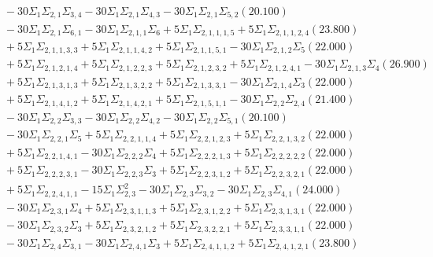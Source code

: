 \documentclass[12pt]{article}
\begin{document}
\begin{landscape}
\begin{align*}
		&\quad\quad -30\Sigma_{1}\Sigma_{2,1}\Sigma_{3,4}-30\Sigma_{1}\Sigma_{2,1}\Sigma_{4,3}-30\Sigma_{1}\Sigma_{2,1}\Sigma_{5,2}(20.100) \\ 
		&\quad\quad -30\Sigma_{1}\Sigma_{2,1}\Sigma_{6,1}-30\Sigma_{1}\Sigma_{2,1,1}\Sigma_{6}+5\Sigma_{1}\Sigma_{2,1,1,1,5}+5\Sigma_{1}\Sigma_{2,1,1,2,4}(23.800) \\ 
		&\quad\quad +5\Sigma_{1}\Sigma_{2,1,1,3,3}+5\Sigma_{1}\Sigma_{2,1,1,4,2}+5\Sigma_{1}\Sigma_{2,1,1,5,1}-30\Sigma_{1}\Sigma_{2,1,2}\Sigma_{5}(22.000) \\ 
		&\quad\quad +5\Sigma_{1}\Sigma_{2,1,2,1,4}+5\Sigma_{1}\Sigma_{2,1,2,2,3}+5\Sigma_{1}\Sigma_{2,1,2,3,2}+5\Sigma_{1}\Sigma_{2,1,2,4,1}-30\Sigma_{1}\Sigma_{2,1,3}\Sigma_{4}(26.900) \\ 
		&\quad\quad +5\Sigma_{1}\Sigma_{2,1,3,1,3}+5\Sigma_{1}\Sigma_{2,1,3,2,2}+5\Sigma_{1}\Sigma_{2,1,3,3,1}-30\Sigma_{1}\Sigma_{2,1,4}\Sigma_{3}(22.000) \\ 
		&\quad\quad +5\Sigma_{1}\Sigma_{2,1,4,1,2}+5\Sigma_{1}\Sigma_{2,1,4,2,1}+5\Sigma_{1}\Sigma_{2,1,5,1,1}-30\Sigma_{1}\Sigma_{2,2}\Sigma_{2,4}(21.400) \\ 
		&\quad\quad -30\Sigma_{1}\Sigma_{2,2}\Sigma_{3,3}-30\Sigma_{1}\Sigma_{2,2}\Sigma_{4,2}-30\Sigma_{1}\Sigma_{2,2}\Sigma_{5,1}(20.100) \\ 
		&\quad\quad -30\Sigma_{1}\Sigma_{2,2,1}\Sigma_{5}+5\Sigma_{1}\Sigma_{2,2,1,1,4}+5\Sigma_{1}\Sigma_{2,2,1,2,3}+5\Sigma_{1}\Sigma_{2,2,1,3,2}(22.000) \\ 
		&\quad\quad +5\Sigma_{1}\Sigma_{2,2,1,4,1}-30\Sigma_{1}\Sigma_{2,2,2}\Sigma_{4}+5\Sigma_{1}\Sigma_{2,2,2,1,3}+5\Sigma_{1}\Sigma_{2,2,2,2,2}(22.000) \\ 
		&\quad\quad +5\Sigma_{1}\Sigma_{2,2,2,3,1}-30\Sigma_{1}\Sigma_{2,2,3}\Sigma_{3}+5\Sigma_{1}\Sigma_{2,2,3,1,2}+5\Sigma_{1}\Sigma_{2,2,3,2,1}(22.000) \\ 
		&\quad\quad +5\Sigma_{1}\Sigma_{2,2,4,1,1}-15\Sigma_{1}\Sigma_{2,3}^{2}-30\Sigma_{1}\Sigma_{2,3}\Sigma_{3,2}-30\Sigma_{1}\Sigma_{2,3}\Sigma_{4,1}(24.000) \\ 
		&\quad\quad -30\Sigma_{1}\Sigma_{2,3,1}\Sigma_{4}+5\Sigma_{1}\Sigma_{2,3,1,1,3}+5\Sigma_{1}\Sigma_{2,3,1,2,2}+5\Sigma_{1}\Sigma_{2,3,1,3,1}(22.000) \\ 
		&\quad\quad -30\Sigma_{1}\Sigma_{2,3,2}\Sigma_{3}+5\Sigma_{1}\Sigma_{2,3,2,1,2}+5\Sigma_{1}\Sigma_{2,3,2,2,1}+5\Sigma_{1}\Sigma_{2,3,3,1,1}(22.000) \\ 
		&\quad\quad -30\Sigma_{1}\Sigma_{2,4}\Sigma_{3,1}-30\Sigma_{1}\Sigma_{2,4,1}\Sigma_{3}+5\Sigma_{1}\Sigma_{2,4,1,1,2}+5\Sigma_{1}\Sigma_{2,4,1,2,1}(23.800) \\ 

\end{align*}
\end{landscape}
\end{document}
